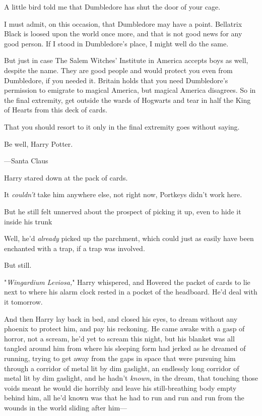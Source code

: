 \begin{writtenNote}
A little bird told me that Dumbledore has shut the door of your cage.

I must admit, on this occasion, that Dumbledore may have a point.
Bellatrix Black is loosed upon the world once more, and that is not good news
for any good person. If I stood in Dumbledore's place, I might well do the
same.

But just in case{\el} The Salem Witches' Institute in America accepts
boys as well, despite the name. They are good people and would protect you even
from Dumbledore, if you needed it. Britain holds that you need Dumbledore's
permission to emigrate to magical America, but magical America disagrees. So in
the final extremity, get outside the wards of Hogwarts and tear in half the
King of Hearts from this deck of cards.

That you should resort to it only in the final extremity goes without
saying.

Be well, Harry Potter.

---Santa Claus
\end{writtenNote}

Harry stared down at the pack of cards.

It \emph{couldn't} take him anywhere else, not right now, Portkeys didn't work
here.

But he still felt unnerved about the prospect of picking it up, even to hide it
inside his trunk{\el}

Well, he'd \emph{already} picked up the parchment, which could just as easily
have been enchanted with a trap, if a trap was involved.

But still.

"\emph{Wingardium Leviosa,}" Harry whispered, and Hovered the packet of cards to lie
next to where his alarm clock rested in a pocket of the headboard. He'd deal
with it tomorrow.

And then Harry lay back in bed, and closed his eyes, to dream without any
phoenix to protect him, and pay his reckoning.
\sbreak
He came awake with a gasp of horror, not a scream, he'd yet to scream this
night, but his blanket was all tangled around him from where his sleeping form
had jerked as he dreamed of running, trying to get away from the gaps in space
that were pursuing him through a corridor of metal lit by dim gaslight, an
endlessly long corridor of metal lit by dim gaslight, and he hadn't
\emph{known}, in the dream, that touching those voids meant he would die
horribly and leave his still-breathing body empty behind him, all he'd known
was that he had to run and run and run from the wounds in the world sliding
after him---

